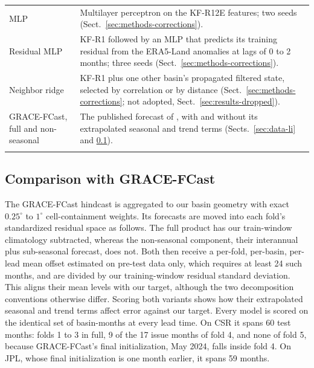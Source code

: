 \documentclass[hess, manuscript]{copernicus}
\begin{document}
\begin{table}[!htbp]
\begin{tabular}{>{\raggedright\arraybackslash}p{3.6cm}>{\raggedright\arraybackslash}p{11.6cm}}
MLP & Multilayer perceptron on the KF-R12E features; two seeds (Sect.~\ref{sec:methods-corrections}). \\
Residual MLP & KF-R1 followed by an MLP that predicts its training residual from the ERA5-Land anomalies at lags of 0 to 2 months; three seeds (Sect.~\ref{sec:methods-corrections}). \\
Neighbor ridge & KF-R1 plus one other basin's propagated filtered state, selected by correlation or by distance (Sect.~\ref{sec:methods-corrections}; not adopted, Sect.~\ref{sec:results-dropped}). \\
GRACE-FCast, full and non-seasonal & The published forecast of \citet{li2026fcast}, with and without its extrapolated seasonal and trend terms (Sects.~\ref{sec:data-li} and \ref{sec:methods-li}). \\
\bottomhline
\end{tabular}
\end{table}

\subsection{Comparison with GRACE-FCast}
\label{sec:methods-li}

The GRACE-FCast hindcast \citep{li2025pangaea} is aggregated to our basin
geometry with exact $0.25^{\circ}$ to $1^{\circ}$ cell-containment
weights. Its forecasts are moved into each fold's standardized residual
space as follows. The full product has our train-window climatology
subtracted, whereas the non-seasonal component, their interannual plus
sub-seasonal forecast, does not. Both then receive a per-fold, per-basin,
per-lead mean offset estimated on pre-test data only, which requires at
least 24 such months, and are divided by our training-window residual
standard deviation. This aligns their mean levels with our target,
although the two decomposition conventions otherwise differ. Scoring both variants
shows how their extrapolated seasonal and trend terms affect error
against our target. Every model is scored on the identical set of basin-months at every lead
time. On CSR it spans 60 test months: folds
1 to 3 in full, 9 of the 17 issue months of fold 4, and none of fold 5,
because GRACE-FCast's final initialization, May 2024, falls inside fold 4.
On JPL, whose final initialization is one month earlier, it spans 59
months.
\end{document}
